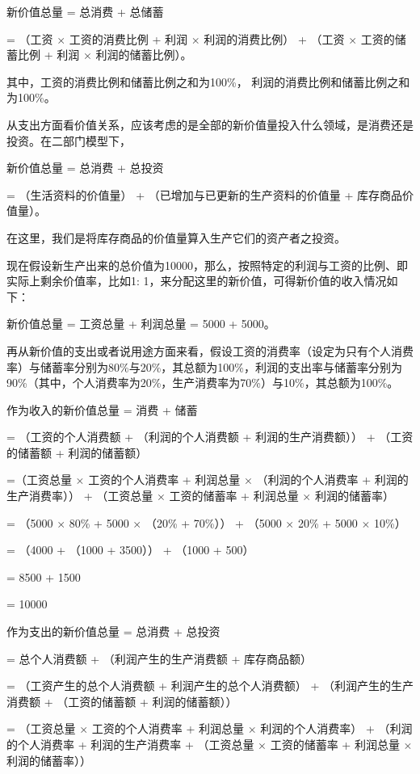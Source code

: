 \documentclass[a4paper]{ctexart}
\begin{document}
新价值总量 = 总消费 + 总储蓄

= （工资 $\times$ 工资的消费比例 + 利润 $\times$ 利润的消费比例） + （工资 $\times$ 工资的储蓄比例 + 利润 $\times$ 利润的储蓄比例）。

其中，工资的消费比例和储蓄比例之和为100\%， 利润的消费比例和储蓄比例之和为100\%。

从支出方面看价值关系，应该考虑的是全部的新价值量投入什么领域，是消费还是投资。在二部门模型下，

新价值总量 = 总消费 + 总投资

= （生活资料的价值量） + （已增加与已更新的生产资料的价值量 + 库存商品价值量）。

在这里，我们是将库存商品的价值量算入生产它们的资产者之投资。

现在假设新生产出来的总价值为10000，那么，按照特定的利润与工资的比例、即实际上剩余价值率，比如1: 1，来分配这里的新价值，可得新价值的收入情况如下：

新价值总量 = 工资总量 + 利润总量 = 5000 + 5000。

再从新价值的支出或者说用途方面来看，假设工资的消费率（设定为只有个人消费率）与储蓄率分别为80\%与20\%，其总额为100\%，利润的支出率与储蓄率分别为90\%（其中，个人消费率为20\%，生产消费率为70\%）与10\%，其总额为100\%。

作为收入的新价值总量 = 消费 + 储蓄

= （工资的个人消费额 + （利润的个人消费额 + 利润的生产消费额）） + （工资的储蓄额 + 利润的储蓄额）

=（工资总量 $\times$ 工资的个人消费率 + 利润总量 $\times$ （利润的个人消费率 + 利润的生产消费率）） + （工资总量 $\times$ 工资的储蓄率 + 利润总量 $\times$ 利润的储蓄率）

= （5000 $\times$ 80\% + 5000 $\times$ （20\% + 70\%）） + （5000 $\times$ 20\% + 5000 $\times$ 10\%）

= （4000 + （1000 + 3500）） + （1000 + 500）

= 8500 + 1500

= 10000

作为支出的新价值总量 = 总消费 + 总投资

= 总个人消费额 + （利润产生的生产消费额 + 库存商品额）

= （工资产生的总个人消费额 + 利润产生的总个人消费额） + （利润产生的生产消费额 + （工资的储蓄额 + 利润的储蓄额））

= （工资总量 $\times$ 工资的个人消费率 + 利润总量 $\times$ 利润的个人消费率） + （利润的个人消费率 + 利润的生产消费率 + （工资总量 $\times$ 工资的储蓄率 + 利润总量 $\times$ 利润的储蓄率））
\end{document}
